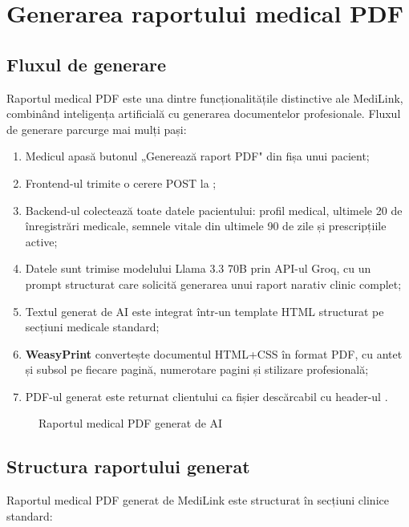 \section{Generarea raportului medical PDF}

\subsection{Fluxul de generare}

Raportul medical PDF este una dintre funcționalitățile distinctive ale MediLink, combinând inteligența artificială cu generarea documentelor profesionale. Fluxul de generare parcurge mai mulți pași:

\begin{enumerate}
  \item Medicul apasă butonul „Generează raport PDF" din fișa unui pacient;
  \item Frontend-ul trimite o cerere POST la ;
  \item Backend-ul colectează toate datele pacientului: profil medical, ultimele 20 de înregistrări medicale, semnele vitale din ultimele 90 de zile și prescripțiile active;
  \item Datele sunt trimise modelului Llama 3.3 70B prin API-ul Groq, cu un prompt structurat care solicită generarea unui raport narativ clinic complet;
  \item Textul generat de AI este integrat într-un template HTML structurat pe secțiuni medicale standard;
  \item \textbf{WeasyPrint} \cite{weasyprint2024} convertește documentul HTML+CSS în format PDF, cu antet și subsol pe fiecare pagină, numerotare pagini și stilizare profesională;
  \item PDF-ul generat este returnat clientului ca fișier descărcabil cu header-ul .
\end{enumerate}

\begin{figure}[H]
  \centering
  \caption{Raportul medical PDF generat de AI}
  \label{fig:raport_pdf}
\end{figure}

\subsection{Structura raportului generat}

Raportul medical PDF generat de MediLink este structurat în secțiuni clinice standard:

